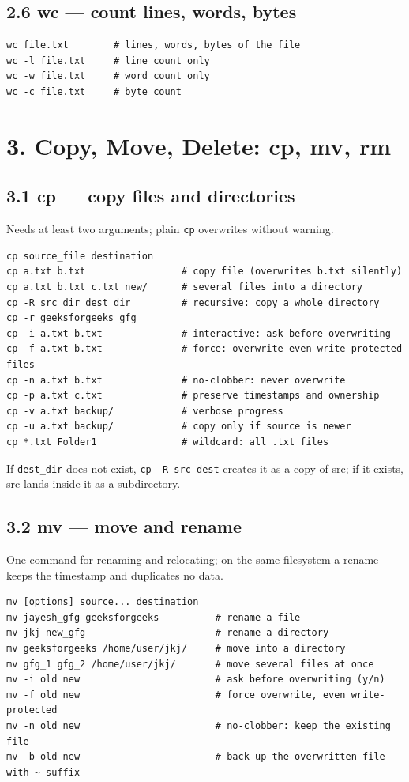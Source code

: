 \documentclass[11pt,a4paper]{article}
\newcommand{\cmd}[1]{\texttt{#1}}
\begin{document}
\subsection{2.6 wc --- count lines, words, bytes}
\begin{lstlisting}
wc file.txt        # lines, words, bytes of the file
wc -l file.txt     # line count only
wc -w file.txt     # word count only
wc -c file.txt     # byte count
\end{lstlisting}

\section{3. Copy, Move, Delete: cp, mv, rm}

\subsection{3.1 cp --- copy files and directories}
Needs at least two arguments; plain \cmd{cp} overwrites without warning.
\begin{lstlisting}
cp source_file destination
cp a.txt b.txt                 # copy file (overwrites b.txt silently)
cp a.txt b.txt c.txt new/      # several files into a directory
cp -R src_dir dest_dir         # recursive: copy a whole directory
cp -r geeksforgeeks gfg
cp -i a.txt b.txt              # interactive: ask before overwriting
cp -f a.txt b.txt              # force: overwrite even write-protected files
cp -n a.txt b.txt              # no-clobber: never overwrite
cp -p a.txt c.txt              # preserve timestamps and ownership
cp -v a.txt backup/            # verbose progress
cp -u a.txt backup/            # copy only if source is newer
cp *.txt Folder1               # wildcard: all .txt files
\end{lstlisting}
If \cmd{dest\_dir} does not exist, \cmd{cp -R src dest} creates it as a copy of src; if it exists, src lands inside it as a subdirectory.

\subsection{3.2 mv --- move and rename}
One command for renaming and relocating; on the same filesystem a rename keeps the timestamp and duplicates no data.
\begin{lstlisting}
mv [options] source... destination
mv jayesh_gfg geeksforgeeks          # rename a file
mv jkj new_gfg                       # rename a directory
mv geeksforgeeks /home/user/jkj/     # move into a directory
mv gfg_1 gfg_2 /home/user/jkj/       # move several files at once
mv -i old new                        # ask before overwriting (y/n)
mv -f old new                        # force overwrite, even write-protected
mv -n old new                        # no-clobber: keep the existing file
mv -b old new                        # back up the overwritten file with ~ suffix
\end{lstlisting}
\end{document}
